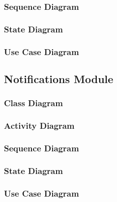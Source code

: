 \documentclass{article}
\begin{document}
			
			\subsubsection{Sequence Diagram}\label{subsec:uml-diagrams-events-seq}
						
			
			\subsubsection{State Diagram}\label{subsec:uml-diagrams-events-state}
			
			
			\subsubsection{Use Case Diagram}\label{subsec:uml-diagrams-events-uc}
						
		\clearpage			
			
		\subsection{Notifications Module}\label{subsec:uml-diagrams-notifications}
		
		
			\subsubsection{Class Diagram}\label{subsec:uml-diagrams-notifications-class}
			
			
			\subsubsection{Activity Diagram}\label{subsec:uml-diagrams-notifications-act}
			
			
			\subsubsection{Sequence Diagram}\label{subsec:uml-diagrams-notifications-seq}
						
			
			\subsubsection{State Diagram}\label{subsec:uml-diagrams-notifications-state}
			
			
			\subsubsection{Use Case Diagram}\label{subsec:uml-diagrams-notifications-uc}
		
\end{document}
